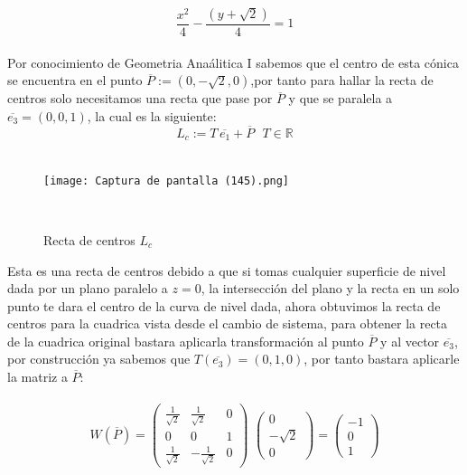 \documentclass[11pt,letterpaper]{article}
\newcommand{\R}{\mathbb{R}}
\begin{document}
     \begin{equation*}
        \frac{x^2}{4}-\frac{(y+\sqrt{2})}{4}=1
     \end{equation*}\,\\
     Por conocimiento de Geometria Ana\'alitica I sabemos que el centro de esta c\'onica se encuentra en el punto $\overline{P}:=(0,-\sqrt{2},0)$,por tanto
     para hallar la recta de centros solo necesitamos una recta que pase por $\overline{P}$ y que se paralela a $\overline{e_3}=(0,0,1)$, la cual es la siguiente:\,\\
     \begin{equation*}
        L_c:=T\,\overline{e_1}+\overline{P}\,\,\,\,T\in \R
     \end{equation*}\,\\
     \begin{figure}
    \centering
    \texttt{[image: Captura de pantalla (145).png]}
    \caption{Recta de centros $L_{c}$}
    \label{Cono rebanado}\,\\
\end{figure}
Esta es una recta de centros debido a que si tomas cualquier superficie de nivel dada por un plano paralelo a $z=0$, la intersecci\'on del plano y la recta en un solo punto
    te dara el centro de la curva de nivel dada, ahora obtuvimos la recta de centros para la cuadrica vista desde el cambio de sistema, para obtener la recta de la cuadrica original bastara
    aplicarla transformaci\'on al punto $\overline{P}$ y al vector $\overline{e_3}$, por construcci\'on ya sabemos que $T(\overline{e_3})=(0,1,0)$, por tanto bastara
    aplicarle la matriz a $\overline{P}$:\,\\
     \,\\
    \begin{equation*}
        W(\overline{P})= \begin{pmatrix}
                \frac{1}{\sqrt{2}} & \frac{1}{\sqrt{2}} & 0\\
                0 & 0& 1\\
                 \frac{1}{\sqrt{2}} & -\frac{1}{\sqrt{2}} &0
                \end{pmatrix}\,\,\begin{pmatrix}
                0\\
                -\sqrt{2}\\
                0
                \end{pmatrix}=\begin{pmatrix}
                -1 \\
                0\\
                1
                \end{pmatrix}
    \end{equation*}\,\\
\end{document}
